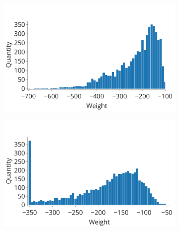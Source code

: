 \documentclass[a4paper,10pt]{article}
\begin{document}
\begin{figure}[H] 
\centering 
\begin{subfigure}{0.3\textwidth}
    \includegraphics[width=\textwidth,keepaspectratio=true]{competition_distribution_clamp_low.pdf}
    \caption{}
    \label{fig:compe_clamp:low_distr}
\end{subfigure}
\begin{subfigure}{0.3\textwidth}
    \includegraphics[width=\textwidth,keepaspectratio=true]{competition_distribution_clamp_high.pdf}
    \caption{}
    \label{fig:compe_clamp:high_distr}
\end{subfigure}
\begin{subfigure}{0.3\textwidth}

\end{subfigure}
\end{figure}
\end{document}
